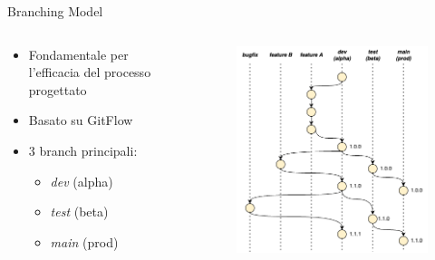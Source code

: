     \begin{frame}{Branching Model}
        \begin{columns}[onlytextwidth]
            \begin{column}{0.5\textwidth}
                \begin{itemize}
                    \item Fondamentale per l'efficacia del processo progettato
                    \item Basato su GitFlow
                    \item 3 branch principali:
                    \begin{itemize}
                        \item \textit{dev} (alpha)
                        \item \textit{test} (beta)
                        \item \textit{main} (prod)
                    \end{itemize}
                \end{itemize}
            \end{column}
            \begin{column}{0.5\textwidth}
                \begin{figure}[H]
                    \centering
                    \includegraphics[width=1\textwidth]{img/tesi-13-branching.drawio.png}
                \end{figure}
            \end{column}
        \end{columns}
    \end{frame}
    
